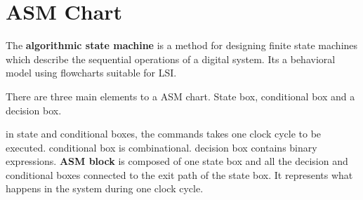 \chapter{ASM Chart}
\thispagestyle{headings}

The \textbf{algorithmic state machine} is a method for designing finite state machines which describe the sequential operations of a digital system. Its a behavioral model using flowcharts suitable for LSI.

There are three main elements to a ASM chart.
State box, conditional box and a decision box.

in state and conditional boxes, the commands takes one clock cycle to be executed. conditional box is combinational. decision box contains binary expressions. \textbf{ASM block} is composed of one state box and all the decision and conditional boxes connected to the exit path of the state box. It represents what happens in the system during one clock cycle.